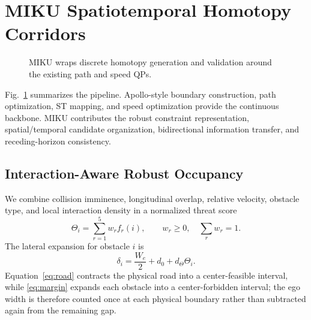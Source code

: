 \section{MIKU Spatiotemporal Homotopy Corridors}
\label{sec:method}

\begin{figure}[t]
\centering
{}
\caption{MIKU wraps discrete homotopy generation and validation around the existing path and speed QPs.}
\label{fig:framework}
\end{figure}

Fig.~\ref{fig:framework} summarizes the pipeline. Apollo-style boundary construction, path optimization, ST mapping, and speed optimization provide the continuous backbone. MIKU contributes the robust constraint representation, spatial/temporal candidate organization, bidirectional information transfer, and receding-horizon consistency.

\subsection{Interaction-Aware Robust Occupancy}

We combine collision imminence, longitudinal overlap, relative velocity, obstacle type, and local interaction density in a normalized threat score
\begin{equation}
 \Theta_i=\sum_{r=1}^{5}w_rf_r(i),\qquad w_r\ge0,\quad\sum_rw_r=1.
 \label{eq:threat}
\end{equation}
The lateral expansion for obstacle $i$ is
\begin{equation}
 \delta_i=\frac{W_e}{2}+d_0+d_\Theta\Theta_i.
 \label{eq:margin}
\end{equation}
Equation~\eqref{eq:road} contracts the physical road into a center-feasible interval, while \eqref{eq:margin} expands each obstacle into a center-forbidden interval; the ego width is therefore counted once at each physical boundary rather than subtracted again from the remaining gap.

